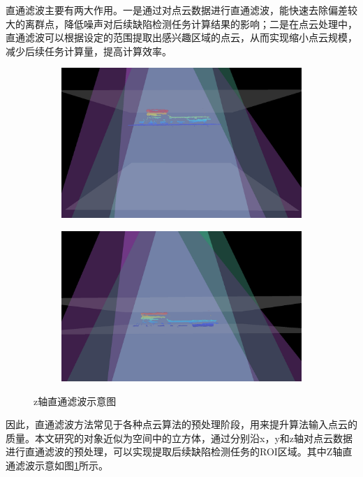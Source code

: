 直通滤波主要有两大作用。一是通过对点云数据进行直通滤波，能快速去除偏差较大的离群点，降低噪声对后续缺陷检测任务计算结果的影响；二是在点云处理中，直通滤波可以根据设定的范围提取出感兴趣区域的点云，从而实现缩小点云规模，减少后续任务计算量，提高计算效率。
\begin{figure}[htbp]
    \centering
    \begin{subfigure}
        \centering
        \includegraphics[width=.45\linewidth]{figures/z_before_passthrough.png}  
      \end{subfigure}
      \begin{subfigure}
        \centering
        \includegraphics[width=.45\linewidth]{figures/z_after_passthrough.png} 
      \end{subfigure}
    \caption{z轴直通滤波示意图}
    \label{fig:z}
\end{figure}

因此，直通滤波方法常见于各种点云算法的预处理阶段，用来提升算法输入点云的质量。本文研究的对象近似为空间中的立方体，通过分别沿x，y和z轴对点云数据进行直通滤波的预处理，可以实现提取后续缺陷检测任务的ROI区域。其中Z轴直通滤波示意如图\ref{fig:z}所示。








